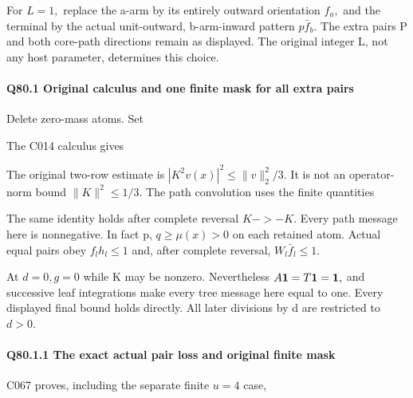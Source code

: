 For \(L=1,\allowbreak \) replace the a-arm by its entirely outward orientation \(f_a,\allowbreak \)
and the terminal by the actual unit-outward, b-arm-inward pattern \(p\bar f_b.\)
The extra pairs P and both core-path directions remain as displayed.
The original integer L, not any host parameter, determines this choice.



\paragraph{Q80.1 Original calculus and one finite mask for all extra pairs}

Delete zero-mass atoms. Set


The C014 calculus gives


The original two-row estimate is \(|K^2v(x)|^2\le \lVert v\rVert _2^2/3.\)
It is not an operator-norm bound \(\lVert K\rVert ^2\le 1/3.\)
The path convolution uses the finite quantities


The same identity holds after complete reversal \(K->-K.\) Every path
message here is nonnegative. In fact p, \(q\ge \mu(x)>0\)
on each retained atom. Actual equal pairs obey \(f_l h_l\le 1\) and,
after complete reversal, \(W_l \bar f_l\le 1.\)

At \(d=0,\allowbreak  g=0\) while K may be nonzero. Nevertheless \(A\mathbf1=T\mathbf1=\mathbf1,\allowbreak \)
and successive leaf integrations make every tree
message here equal to one. Every displayed final bound
holds directly. All later divisions by d are restricted to \(d>0.\)

\paragraph{Q80.1.1 The exact actual pair loss and original finite mask}

C067 proves, including the separate finite \(u=4\) case,

